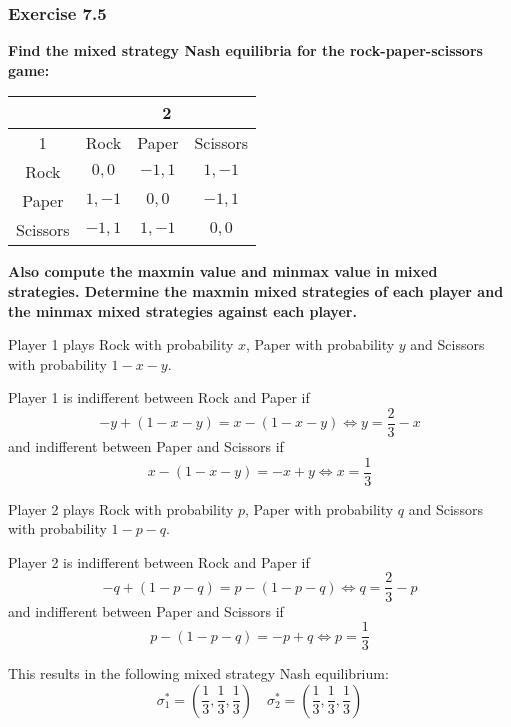 \documentclass[12pt, a4paper]{article}
\begin{document}
\subsubsection*{Exercise 7.5}

\textbf{Find the mixed strategy Nash equilibria for the rock-paper-scissors game:}

\begin{table}[ht!]
    \centering
    \begin{tabular}{|c|c|c|c|}                   \hline
                 & \multicolumn{3}{|c|}{2}    \\ \hline
        1        & Rock   & Paper  & Scissors \\ \hline
        Rock     & $0,0$  & $-1,1$ & $1,-1$   \\ \hline
        Paper    & $1,-1$ & $0,0$  & $-1,1$   \\ \hline
        Scissors & $-1,1$ & $1,-1$ & $0,0$    \\ \hline
    \end{tabular}
\end{table}

\textbf{Also compute the maxmin value and minmax value in mixed strategies. Determine the maxmin mixed strategies of each player and the minmax mixed strategies against each player.}

Player 1 plays Rock with probability $x$, Paper with probability $y$ and Scissors with probability $1-x-y$.

Player 1 is indifferent between Rock and Paper if 
\[ -y + (1-x-y) = x - (1-x-y) \Leftrightarrow y = \frac{2}{3} - x \]
and indifferent between Paper and Scissors if
\[ x - (1-x-y) = -x + y \Leftrightarrow  x = \frac{1}{3}\]

Player 2 plays Rock with probability $p$, Paper with probability $q$ and Scissors with probability $1-p-q$.

Player 2 is indifferent between Rock and Paper if
\[ -q + (1-p-q) = p - (1-p-q) \Leftrightarrow q = \frac{2}{3} - p \]
and indifferent between Paper and Scissors if
\[ p - (1-p-q) = -p + q \Leftrightarrow p = \frac{1}{3} \]

This results in the following mixed strategy Nash equilibrium:
\[ \sigma_1^* = \left(\frac{1}{3}, \frac{1}{3}, \frac{1}{3}\right)\quad
\sigma_2^* = \left(\frac{1}{3}, \frac{1}{3}, \frac{1}{3}\right) \]


\end{document}
